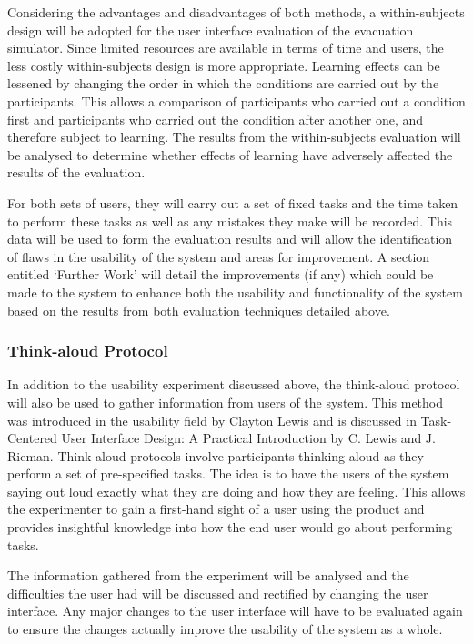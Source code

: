 Considering the advantages and disadvantages of both methods, a within-subjects design will be adopted for the user interface evaluation of the evacuation simulator. Since limited resources are available in terms of time and users, the less costly within-subjects design is more appropriate. Learning effects can be lessened by changing the order in which the conditions are carried out by the participants. This allows a comparison of participants who carried out a condition first and participants who carried out the condition after another one, and therefore subject to learning. The results from the within-subjects evaluation will be analysed to determine whether effects of learning have adversely affected the results of the evaluation.

For both sets of users, they will carry out a set of fixed tasks and the time taken to perform these tasks as well as any mistakes they make will be recorded. This data will be used to form the evaluation results and will allow the identification of flaws in the usability of the system and areas for improvement. A section entitled ‘Further Work’ will detail the improvements (if any) which could be made to the system to enhance both the usability and functionality of the system based on the results from both evaluation techniques detailed above.

\subsubsection{Think-aloud Protocol}
In addition to the usability experiment discussed above, the think-aloud protocol will also be used to gather information from users of the system. This method was introduced in the usability field by Clayton Lewis and is discussed in Task-Centered User Interface Design: A Practical Introduction by C. Lewis and J. Rieman\cite{uidesign}. Think-aloud protocols involve participants thinking aloud as they perform a set of pre-specified tasks. The idea is to have the users of the system saying out loud exactly what they are doing and how they are feeling. This allows the experimenter to gain a first-hand sight of a user using the product and provides insightful knowledge into how the end user would go about performing tasks.

The information gathered from the experiment will be analysed and the difficulties the user had will be discussed and rectified by changing the user interface. Any major changes to the user interface will have to be evaluated again to ensure the changes actually improve the usability of the system as a whole. 

